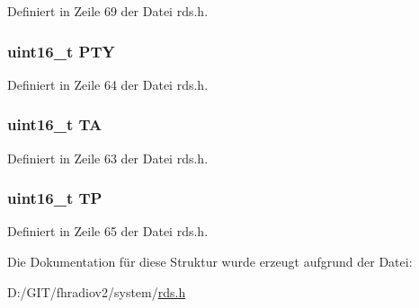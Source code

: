 Definiert in Zeile 69 der Datei rds.\+h.

\hypertarget{structgroup__0a_a0474967478fbbc2c71b800d2e0132d45}{}
\subsubsection[{P\+T\+Y}]{\setlength{\rightskip}{0pt plus 5cm}uint16\+\_\+t P\+T\+Y}\label{structgroup__0a_a0474967478fbbc2c71b800d2e0132d45}


Definiert in Zeile 64 der Datei rds.\+h.

\hypertarget{structgroup__0a_a6de7751205cef4ffcce610399a030892}{}
\subsubsection[{T\+A}]{\setlength{\rightskip}{0pt plus 5cm}uint16\+\_\+t T\+A}\label{structgroup__0a_a6de7751205cef4ffcce610399a030892}


Definiert in Zeile 63 der Datei rds.\+h.

\hypertarget{structgroup__0a_ab9e634c63b0d95a96716d5f6d7f06d72}{}
\subsubsection[{T\+P}]{\setlength{\rightskip}{0pt plus 5cm}uint16\+\_\+t T\+P}\label{structgroup__0a_ab9e634c63b0d95a96716d5f6d7f06d72}


Definiert in Zeile 65 der Datei rds.\+h.



Die Dokumentation für diese Struktur wurde erzeugt aufgrund der Datei\+:\begin{DoxyCompactItemize}
\item 
D\+:/\+G\+I\+T/fhradiov2/system/\hyperlink{rds_8h}{rds.\+h}\end{DoxyCompactItemize}
